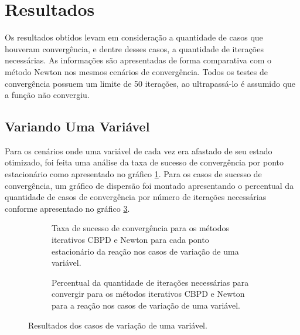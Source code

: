 \section{Resultados}

Os resultados obtidos levam em consideração a quantidade de casos que houveram convergência, e dentre desses casos, a quantidade de iterações necessárias. As informações são apresentadas de forma comparativa com o método Newton nos mesmos cenários de convergência. Todos os testes de convergência possuem um limite de 50 iterações, ao ultrapassá-lo é assumido que a função não convergiu. 

\subsection{Variando Uma Variável}
\label{sec:res-one-var}

Para os cenários onde uma variável de cada vez era afastado de seu estado otimizado, foi feita uma análise da taxa de sucesso de convergência por ponto estacionário como apresentado no gráfico \ref{fig:result-one-var-conv-tax}. Para os casos de sucesso de convergência, um gráfico de dispersão foi montado apresentando o percentual da quantidade de casos de convergência por número de iterações necessárias conforme apresentado no gráfico \ref{fig:result-one-var-conv-metric}.

\begin{figure}[h]
  \begin{subfigure}{.5\textwidth}
    \begin{center}
      
    \end{center}
    \caption{Taxa de sucesso de convergência para os métodos iterativos CBPD e Newton para cada ponto estacionário da reação  nos casos de variação de uma variável.}
    \label{fig:result-one-var-conv-tax}
  \end{subfigure}%
  \begin{subfigure}{.5\textwidth}
    \begin{center}
      
    \end{center}
    \caption{Percentual da quantidade de iterações necessárias para convergir para os métodos iterativos CBPD e Newton para a reação  nos casos de variação de uma variável.}
    \label{fig:result-one-var-conv-metric}
  \end{subfigure}
  \caption{Resultados dos casos de variação de uma variável.}
\end{figure}

